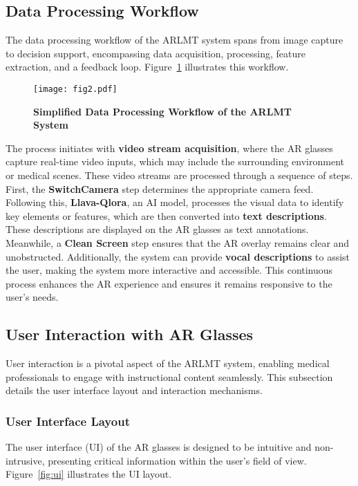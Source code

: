 \documentclass[10pt,letterpaper]{article}
\begin{document}
\subsection*{Data Processing Workflow}

The data processing workflow of the ARLMT system spans from image capture to decision support, encompassing data acquisition, processing, feature extraction, and a feedback loop. Figure~\ref{fig:workflow} illustrates this workflow.

\begin{figure}[ht]
\centering
\texttt{[image: fig2.pdf]}
\caption{\bf Simplified Data Processing Workflow of the ARLMT System}
\label{fig:workflow}
\end{figure}

The process initiates with \textbf{video stream acquisition}, where the AR glasses capture real-time video inputs, which may include the surrounding environment or medical scenes. These video streams are processed through a sequence of steps. First, the \textbf{SwitchCamera} step determines the appropriate camera feed. Following this, \textbf{Llava-Qlora}, an AI model, processes the visual data to identify key elements or features, which are then converted into \textbf{text descriptions}. These descriptions are displayed on the AR glasses as text annotations. Meanwhile, a \textbf{Clean Screen} step ensures that the AR overlay remains clear and unobstructed. Additionally, the system can provide \textbf{vocal descriptions} to assist the user, making the system more interactive and accessible. This continuous process enhances the AR experience and ensures it remains responsive to the user’s needs.

\subsection*{User Interaction with AR Glasses}

User interaction is a pivotal aspect of the ARLMT system, enabling medical professionals to engage with instructional content seamlessly. This subsection details the user interface layout and interaction mechanisms.

\subsubsection*{User Interface Layout}

The user interface (UI) of the AR glasses is designed to be intuitive and non-intrusive, presenting critical information within the user’s field of view. Figure~\ref{fig:ui} illustrates the UI layout.
\end{document}
